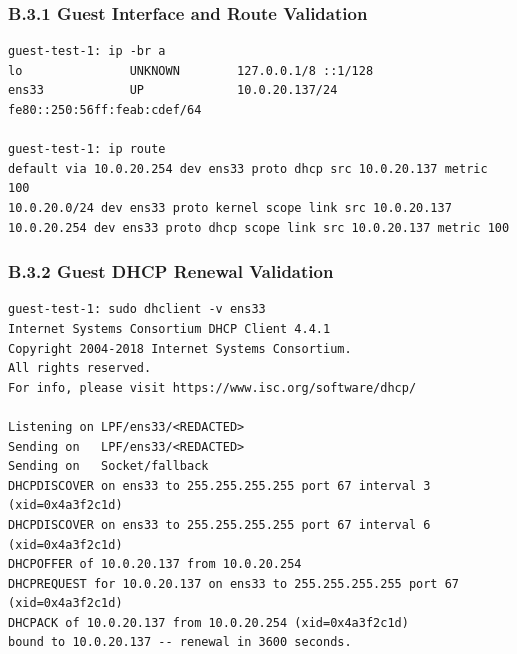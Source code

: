 \documentclass[11pt]{article}
\begin{document}
\subsubsection{B.3.1 Guest Interface and Route Validation}
\label{sec:appendix-b-guest-interface-and-route-validation}

\begin{verbatim}
guest-test-1: ip -br a
lo               UNKNOWN        127.0.0.1/8 ::1/128
ens33            UP             10.0.20.137/24 fe80::250:56ff:feab:cdef/64

guest-test-1: ip route
default via 10.0.20.254 dev ens33 proto dhcp src 10.0.20.137 metric 100
10.0.20.0/24 dev ens33 proto kernel scope link src 10.0.20.137
10.0.20.254 dev ens33 proto dhcp scope link src 10.0.20.137 metric 100
\end{verbatim}


\subsubsection{B.3.2 Guest DHCP Renewal Validation}
\label{sec:appendix-b-guest-dhcp-renewal-validation}

\begin{verbatim}
guest-test-1: sudo dhclient -v ens33
Internet Systems Consortium DHCP Client 4.4.1
Copyright 2004-2018 Internet Systems Consortium.
All rights reserved.
For info, please visit https://www.isc.org/software/dhcp/

Listening on LPF/ens33/<REDACTED>
Sending on   LPF/ens33/<REDACTED>
Sending on   Socket/fallback
DHCPDISCOVER on ens33 to 255.255.255.255 port 67 interval 3 (xid=0x4a3f2c1d)
DHCPDISCOVER on ens33 to 255.255.255.255 port 67 interval 6 (xid=0x4a3f2c1d)
DHCPOFFER of 10.0.20.137 from 10.0.20.254
DHCPREQUEST for 10.0.20.137 on ens33 to 255.255.255.255 port 67 (xid=0x4a3f2c1d)
DHCPACK of 10.0.20.137 from 10.0.20.254 (xid=0x4a3f2c1d)
bound to 10.0.20.137 -- renewal in 3600 seconds.
\end{verbatim}

\end{document}
